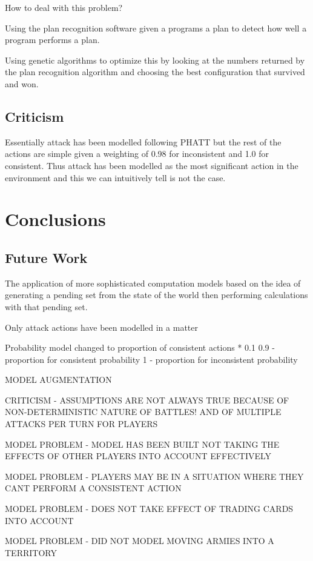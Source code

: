 \documentclass[parskip]{cs4rep}
\begin{document}
How to deal with this problem?

Using the plan recognition software given a programs a plan to detect how well a program performs a plan. 

Using genetic algorithms to optimize this by looking at the numbers returned by the plan recognition algorithm and choosing the best configuration that survived and won.

\section{Criticism}

Essentially attack has been modelled following PHATT but the rest of the actions are simple given a weighting of 0.98 for inconsistent and 1.0 for consistent. Thus attack has been modelled as the most significant action in the environment and this we can intuitively tell is not the case.

\chapter{Conclusions}

\section{Future Work}

The application of more sophisticated computation models based on the idea of generating a pending set from the state of the world then performing calculations with that pending set.

Only attack actions have been modelled in a matter 

Probability model changed to proportion of consistent actions * 0.1 
0.9 - proportion for consistent probability
1 - proportion for inconsistent probability

MODEL AUGMENTATION

CRITICISM - ASSUMPTIONS ARE NOT ALWAYS TRUE BECAUSE OF NON-DETERMINISTIC NATURE OF BATTLES! AND OF MULTIPLE ATTACKS PER TURN FOR PLAYERS

MODEL PROBLEM - MODEL HAS BEEN BUILT NOT TAKING THE EFFECTS OF OTHER PLAYERS INTO ACCOUNT EFFECTIVELY

MODEL PROBLEM - PLAYERS MAY BE IN A SITUATION WHERE THEY CANT PERFORM A CONSISTENT ACTION

MODEL PROBLEM - DOES NOT TAKE EFFECT OF TRADING CARDS INTO ACCOUNT

MODEL PROBLEM - DID NOT MODEL MOVING ARMIES INTO A TERRITORY
\end{document}
